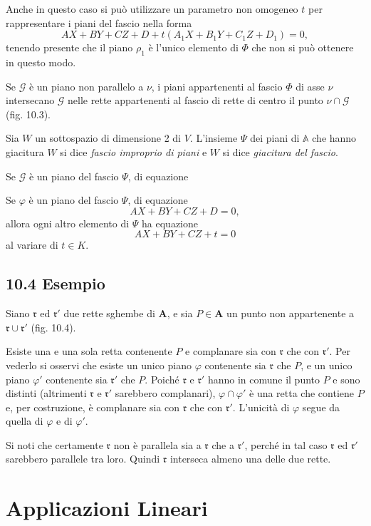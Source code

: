 \documentclass{article}
\theoremstyle{plain}
\theoremstyle{definition}
\theoremstyle{remark}
\begin{document}
Anche in questo caso si può utilizzare un parametro non omogeneo $t$ per rappresentare i piani del fascio nella forma
\[
AX + BY + CZ + D + t(A_1 X + B_1 Y + C_1 Z + D_1) = 0,
\]
tenendo presente che il piano $\rho_1$ è l'unico elemento di $\Phi$ che non si può ottenere in questo modo.

Se $\mathscr{G}$ è un piano non parallelo a $\nu$, i piani appartenenti al fascio $\Phi$ di asse $\nu$ intersecano $\mathscr{G}$ nelle rette appartenenti al fascio di rette di centro il punto $\nu \cap \mathscr{G}$ (fig. 10.3).

Sia $W$ un sottospazio di dimensione 2 di $V$. L'insieme $\Psi$ dei piani di $\mathbb{A}$ che hanno giacitura $W$ si dice \textit{fascio improprio di piani} e $W$ si dice \textit{giacitura del fascio}.

Se $\mathscr{G}$ è un piano del fascio $\Psi$, di equazione

Se $\varphi$ è un piano del fascio $\Psi$, di equazione
\[AX + BY + CZ + D = 0,\]
allora ogni altro elemento di $\Psi$ ha equazione
\[AX + BY + CZ + t = 0\]
al variare di $t \in K$.

\subsection*{10.4 Esempio}
Siano $\mathfrak{r}$ ed $\mathfrak{r}'$ due rette sghembe di $\mathbf{A}$, e sia $P \in \mathbf{A}$ un punto non appartenente a $\mathfrak{r} \cup \mathfrak{r}'$ (fig. 10.4).

Esiste una e una sola retta contenente $P$ e complanare sia con $\mathfrak{r}$ che con $\mathfrak{r}'$. Per vederlo si osservi che esiste un unico piano $\varphi$ contenente sia $\mathfrak{r}$ che $P$, e un unico piano $\varphi'$ contenente sia $\mathfrak{r}'$ che $P$. Poiché $\mathfrak{r}$ e $\mathfrak{r}'$ hanno in comune il punto $P$ e sono distinti (altrimenti $\mathfrak{r}$ e $\mathfrak{r}'$ sarebbero complanari), $\varphi \cap \varphi'$ è una retta che contiene $P$ e, per costruzione, è complanare sia con $\mathfrak{r}$ che con $\mathfrak{r}'$. L'unicità di $\varphi$ segue da quella di $\varphi$ e di $\varphi'$.

Si noti che certamente $\mathfrak{r}$ non è parallela sia a $\mathfrak{r}$ che a $\mathfrak{r}'$, perché in tal caso $\mathfrak{r}$ ed $\mathfrak{r}'$ sarebbero parallele tra loro. Quindi $\mathfrak{r}$ interseca almeno una delle due rette.


\newpage
\section{Applicazioni Lineari}
\vspace{20pt}
\end{document}
